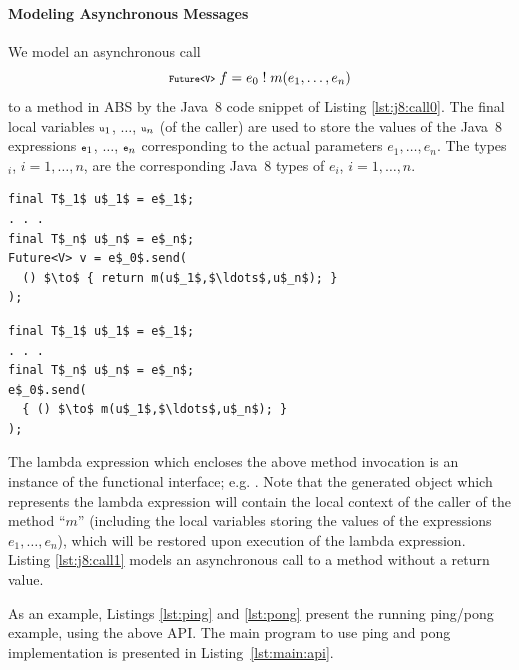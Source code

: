 \paragraph{Modeling Asynchronous Messages} 
\label{par:asynchronous_messages}
We model an asynchronous call 
$$
{\scriptsize\texttt{Future<V>}} \; f = e_0\; !\; m(e_1,\ldots,e_n)
$$
to a method in ABS by the Java~8 code snippet of Listing \ref{lst:j8:call0}.
The final local variables ${\scriptsize\texttt{u}}_1$, $\ldots$, ${\scriptsize\texttt{u}}_n$ (of the caller) are used to store the values of
the Java~8 expressions ${\scriptsize\texttt{e}}_1$, $\ldots$, ${\scriptsize\texttt{e}}_n$ corresponding to the actual parameters  $e_1,\ldots,e_n$.
The types $_i$, $i=1,\ldots,n$,  are the corresponding Java~8 types of  $e_i$, $i=1,\ldots,n$.
\begin{center}
\begin{minipage}[t]{0.48\textwidth}
\begin{lstlisting}[mathescape,caption=Async messages with futures,label=lst:j8:call0]
final T$_1$ u$_1$ = e$_1$;
. . . 
final T$_n$ u$_n$ = e$_n$;
Future<V> v = e$_0$.send(
  () $\to$ { return m(u$_1$,$\ldots$,u$_n$); }
);
\end{lstlisting}
\end{minipage}
\hfill
\begin{minipage}[t]{0.48\textwidth}
\begin{lstlisting}[mathescape,caption=Async messages w/o futures,label=lst:j8:call1]
final T$_1$ u$_1$ = e$_1$;
. . . 
final T$_n$ u$_n$ = e$_n$;
e$_0$.send(
  { () $\to$ m(u$_1$,$\ldots$,u$_n$); }
);
\end{lstlisting}
\end{minipage}
\end{center}

The lambda expression  which encloses the above method invocation  is an instance of the  functional interface; e.g. .
Note that the generated object which  represents the  lambda expression will contain the local context of the caller of the method ``$m$'' (including the local variables storing the values of the expressions $e_1,\ldots,e_n$), which will be restored upon execution of the lambda expression. 
Listing \ref{lst:j8:call1} models an asynchronous call to a method without a return value.

As an example, Listings \ref{lst:ping} and \ref{lst:pong} present the running ping/pong example, using the above API.
The main program to use ping and pong implementation is presented in Listing~\ref{lst:main:api}.

